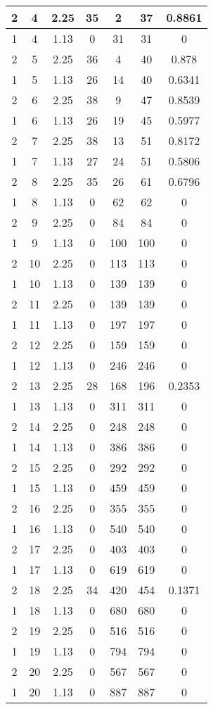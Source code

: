 \documentclass[letterpaper, 12pt]{article}
\begin{document}
\begin{longtable}{|c|c|c|c|c|c|c|}
\hline
2 & 4 & 2.25 & 35 & 2 & 37 & 0.8861 \\
\hline
1 & 4 & 1.13 & 0 & 31 & 31 & 0 \\
\hline
2 & 5 & 2.25 & 36 & 4 & 40 & 0.878 \\
\hline
1 & 5 & 1.13 & 26 & 14 & 40 & 0.6341 \\
\hline
2 & 6 & 2.25 & 38 & 9 & 47 & 0.8539 \\
\hline
1 & 6 & 1.13 & 26 & 19 & 45 & 0.5977 \\
\hline
2 & 7 & 2.25 & 38 & 13 & 51 & 0.8172 \\
\hline
1 & 7 & 1.13 & 27 & 24 & 51 & 0.5806 \\
\hline
2 & 8 & 2.25 & 35 & 26 & 61 & 0.6796 \\
\hline
1 & 8 & 1.13 & 0 & 62 & 62 & 0 \\
\hline
2 & 9 & 2.25 & 0 & 84 & 84 & 0 \\
\hline
1 & 9 & 1.13 & 0 & 100 & 100 & 0 \\
\hline
2 & 10 & 2.25 & 0 & 113 & 113 & 0 \\
\hline
1 & 10 & 1.13 & 0 & 139 & 139 & 0 \\
\hline
2 & 11 & 2.25 & 0 & 139 & 139 & 0 \\
\hline
1 & 11 & 1.13 & 0 & 197 & 197 & 0 \\
\hline
2 & 12 & 2.25 & 0 & 159 & 159 & 0 \\
\hline
1 & 12 & 1.13 & 0 & 246 & 246 & 0 \\
\hline
2 & 13 & 2.25 & 28 & 168 & 196 & 0.2353 \\
\hline
1 & 13 & 1.13 & 0 & 311 & 311 & 0 \\
\hline
2 & 14 & 2.25 & 0 & 248 & 248 & 0 \\
\hline
1 & 14 & 1.13 & 0 & 386 & 386 & 0 \\
\hline
2 & 15 & 2.25 & 0 & 292 & 292 & 0 \\
\hline
1 & 15 & 1.13 & 0 & 459 & 459 & 0 \\
\hline
2 & 16 & 2.25 & 0 & 355 & 355 & 0 \\
\hline
1 & 16 & 1.13 & 0 & 540 & 540 & 0 \\
\hline
2 & 17 & 2.25 & 0 & 403 & 403 & 0 \\
\hline
1 & 17 & 1.13 & 0 & 619 & 619 & 0 \\
\hline
2 & 18 & 2.25 & 34 & 420 & 454 & 0.1371 \\
\hline
1 & 18 & 1.13 & 0 & 680 & 680 & 0 \\
\hline
2 & 19 & 2.25 & 0 & 516 & 516 & 0 \\
\hline
1 & 19 & 1.13 & 0 & 794 & 794 & 0 \\
\hline
2 & 20 & 2.25 & 0 & 567 & 567 & 0 \\
\hline
1 & 20 & 1.13 & 0 & 887 & 887 & 0 \\
\hline
\end{longtable}
\end{document}
